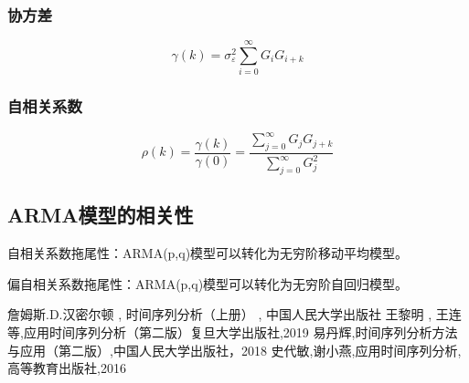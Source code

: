 \documentclass[12pt, a4paper, oneside]{ctexbook}
\begin{document}
\subsubsection{协方差}
\begin{equation}
    \gamma(k)=\sigma_\varepsilon^2\sum_{i=0}^\infty G_iG_{i+k}
\end{equation}

\subsubsection{自相关系数}
\begin{equation}
    \rho(k)=\frac{\gamma(k)}{\gamma(0)}=\frac{\sum_{j=0}^\infty G_jG_{j+k}}{\sum_{j=0}^\infty G_j^2}
\end{equation}

\subsection{ARMA模型的相关性}
自相关系数拖尾性：ARMA(p,q)模型可以转化为无穷阶移动平均模型。

偏自相关系数拖尾性：ARMA(p,q)模型可以转化为无穷阶自回归模型。








\begin{thebibliography}{4}
    詹姆斯.D.汉密尔顿 {,} 时间序列分析（上册） {,} 中国人民大学出版社
    王黎明 {,} 王连等{,}应用时间序列分析（第二版）复旦大学出版社{,}2019
    易丹辉{,}时间序列分析方法与应用（第二版）{,}中国人民大学出版社，2018
    史代敏{,}谢小燕{,}应用时间序列分析{,}高等教育出版社{,}2016
\end{thebibliography}

\appendix
\end{document}
